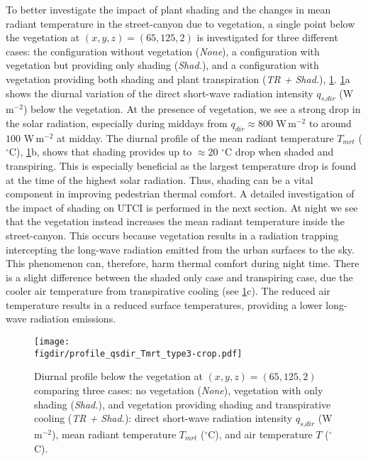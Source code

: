 To better investigate the impact of plant shading and the changes in mean radiant temperature in the street-canyon due to vegetation, a single point below the vegetation at $(x,y,z) = (65, 125, 2)$ is investigated for three different cases: the configuration without vegetation (\textit{None}), a configuration with vegetation but providing only shading (\textit{Shad.}), and a configuration with vegetation providing both shading and plant transpiration (\textit{TR + Shad.}), \cref{fig:profile_qsdir_Tmrt}. \cref{fig:profile_qsdir_Tmrt}a shows the diurnal variation of the direct short-wave radiation intensity $q_{\textit{s,dir}}$ (W\,m$^{-2}$) below the vegetation. At the presence of vegetation, we see a strong drop in the solar radiation, especially during middays from $q_{dir} \approx 800$ W\,m$^{-2}$ to around $100$ W\,m$^{-2}$ at midday. The diurnal profile of the mean radiant temperature $T_{\textit{mrt}}$ ($^{\circ}$C), \cref{fig:profile_qsdir_Tmrt}b, shows that shading provides up to $\approx 20$ $^{\circ}$C drop when shaded and transpiring. This is especially beneficial as the largest temperature drop is found at the time of the highest solar radiation. Thus, shading can be a vital component in improving pedestrian thermal comfort. A detailed investigation of the impact of shading on UTCI is performed in the next section. At night we see that the vegetation instead increases the mean radiant temperature inside the street-canyon. This occurs because vegetation results in a radiation trapping intercepting the long-wave radiation emitted from the urban surfaces to the sky. This phenomenon can, therefore, harm thermal comfort during night time. There is a slight difference between the shaded only case and transpiring case, due the cooler air temperature from transpirative cooling (see \cref{fig:profile_qsdir_Tmrt}c). The reduced air temperature results in a reduced surface temperatures, providing a lower long-wave radiation emissions.

\begin{figure}[p]
	\centering
	\texttt{[image: \\figdir/profile\_qsdir\_Tmrt\_type3-crop.pdf]}
	\caption{Diurnal profile below the vegetation at $(x,y,z) = (65, 125, 2)$ comparing three cases: no vegetation (\textit{None}), vegetation with only shading (\textit{Shad.}), and vegetation providing shading and transpirative cooling (\textit{TR + Shad.}):  direct short-wave radiation intensity $q_{\textit{s,dir}}$ (W\,m$^{-2}$),  mean radiant temperature $T_{\textit{mrt}}$  ($^{\circ}$C), and  air temperature $T$  ($^{\circ}$C).}
	\label{fig:profile_qsdir_Tmrt}
\end{figure}

